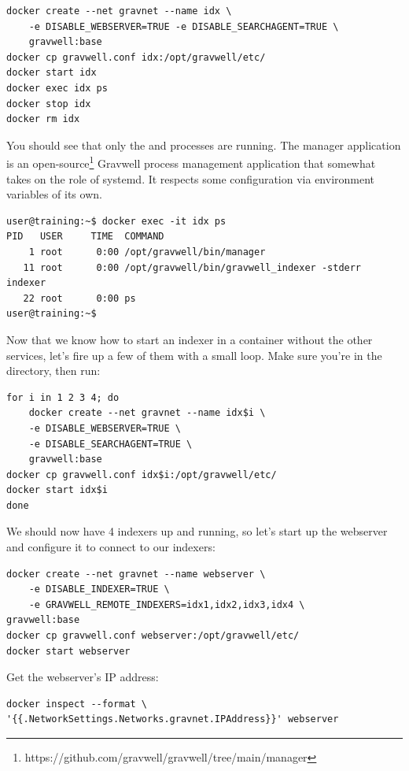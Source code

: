 \begin{Verbatim}[breaklines=true]
docker create --net gravnet --name idx \
    -e DISABLE_WEBSERVER=TRUE -e DISABLE_SEARCHAGENT=TRUE \
    gravwell:base
docker cp gravwell.conf idx:/opt/gravwell/etc/
docker start idx
docker exec idx ps
docker stop idx
docker rm idx
\end{Verbatim}

You should see that only the  and  processes are
running. The manager application is an open-source\footnote{https://github.com/gravwell/gravwell/tree/main/manager} Gravwell
process management application that somewhat takes on the role of
systemd. It respects some configuration via environment variables of its own.

\begin{Verbatim}[breaklines=true]
user@training:~$ docker exec -it idx ps
PID   USER     TIME  COMMAND
    1 root      0:00 /opt/gravwell/bin/manager
   11 root      0:00 /opt/gravwell/bin/gravwell_indexer -stderr indexer
   22 root      0:00 ps
user@training:~$
\end{Verbatim}

Now that we know how to start an indexer in a container without the
other services, let's fire up a few of them with a small loop. Make sure
you're in the \code{Indexers/Lab-Docker/config} directory, then run:

\begin{Verbatim}[breaklines=true]
for i in 1 2 3 4; do
    docker create --net gravnet --name idx$i \
    -e DISABLE_WEBSERVER=TRUE \
    -e DISABLE_SEARCHAGENT=TRUE \
    gravwell:base
docker cp gravwell.conf idx$i:/opt/gravwell/etc/
docker start idx$i
done
\end{Verbatim}

We should now have 4 indexers up and running, so let's start up the
webserver and configure it to connect to our indexers:

\begin{Verbatim}[breaklines=true]
docker create --net gravnet --name webserver \
    -e DISABLE_INDEXER=TRUE \
    -e GRAVWELL_REMOTE_INDEXERS=idx1,idx2,idx3,idx4 \
gravwell:base
docker cp gravwell.conf webserver:/opt/gravwell/etc/
docker start webserver
\end{Verbatim}

Get the webserver's IP address:

\begin{Verbatim}[breaklines=true]
docker inspect --format \
'{{.NetworkSettings.Networks.gravnet.IPAddress}}' webserver
\end{Verbatim}

